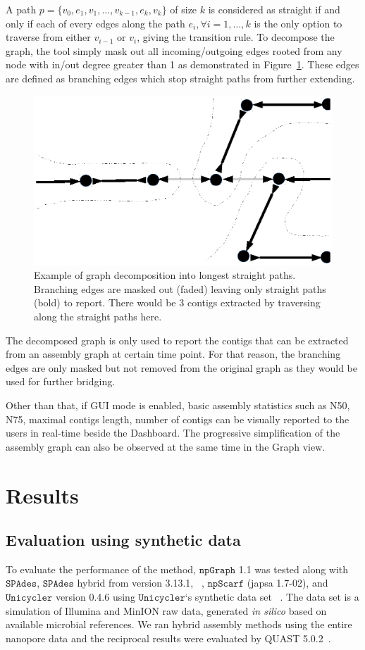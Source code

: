 \documentclass[10pt,letterpaper]{article}
\newcommand{\npscarf}{$\mathtt{npScarf}$}
\newcommand{\npgraph}{$\mathtt{npGraph}$}
\newcommand{\unicycler}{$\mathtt{Unicycler}$}
\newcommand{\spades}{$\mathtt{SPAdes}$}
\begin{document}
A path $p=\{v_0,e_1,v_1,\ldots,v_{k-1},e_k,v_k\}$ of size $k$ is considered as straight if and only if each of every edges along the path $e_i, \forall i=1,\ldots,k$ is the only option to traverse from either $v_{i-1}$ or $v_i$, giving the transition rule.
To decompose the graph, the tool simply mask out all incoming/outgoing edges rooted from any node with in/out degree greater than 1 as demonstrated in Figure~\ref{figure:npgraph_decompose}. These edges are defined as branching edges which stop straight paths from further extending.

\begin{figure}[!hpt]
\centering
\includegraphics[width=.6\textwidth]{images/Fig5.eps}
\caption{Example of graph decomposition into longest straight paths. Branching edges are masked out (faded) leaving only straight paths (bold) to report. There would be 3 contigs extracted by traversing along the straight paths here.}
\label{figure:npgraph_decompose}
\end{figure}

The decomposed graph is only used to report the contigs that can be extracted from an assembly graph at certain time point. For that reason, the branching edges are only masked but not removed from the original graph as they would be used for further bridging.

Other than that, if GUI mode is enabled, basic assembly statistics such as N50, N75, maximal contigs length, number of contigs can be visually reported to the users in real-time beside the Dashboard. The progressive simplification of the assembly graph can also be observed at the same time in the Graph view.


\section*{Results}
\subsection*{Evaluation using synthetic data}
To evaluate the performance of the method, \npgraph{} 1.1 was tested along with \spades{}, \spades{} hybrid from version 3.13.1, ~\cite{AntipovKM2015}, \npscarf{} (japsa 1.7-02), and \unicycler{} version 0.4.6 %
using \unicycler{}`s synthetic data set~ \cite{Wick2017unicycler} . 
The data set is a simulation of Illumina and MinION raw data, generated \emph{in silico} based on available microbial references.
We ran hybrid assembly methods using the entire nanopore data and the reciprocal results were evaluated by QUAST 5.0.2~\cite{Mikheenko2018quast5}. 
\end{document}
